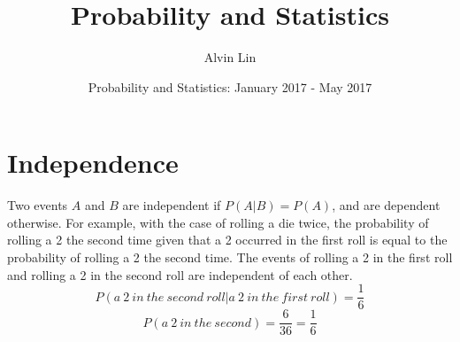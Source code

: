 \documentclass{math}
\title{Probability and Statistics}
\author{Alvin Lin}
\date{Probability and Statistics: January 2017 - May 2017}
\begin{document}
\maketitle

\section*{Independence}
Two events \( A \) and \( B \) are independent if \( P(A|B) = P(A) \), and are
dependent otherwise. For example, with the case of rolling a die twice, the
probability of rolling a 2 the second time given that a 2 occurred in the first
roll is equal to the probability of rolling a 2 the second time. The events of
rolling a 2 in the first roll and rolling a 2 in the second roll are
independent of each other.
\[ P(a\ 2\ in\ the\ second\ roll|a\ 2\ in\ the\ first\ roll) = \frac{1}{6} \]
\[ P(a\ 2\ in\ the\ second) = \frac{6}{36} = \frac{1}{6} \]
\end{document}
